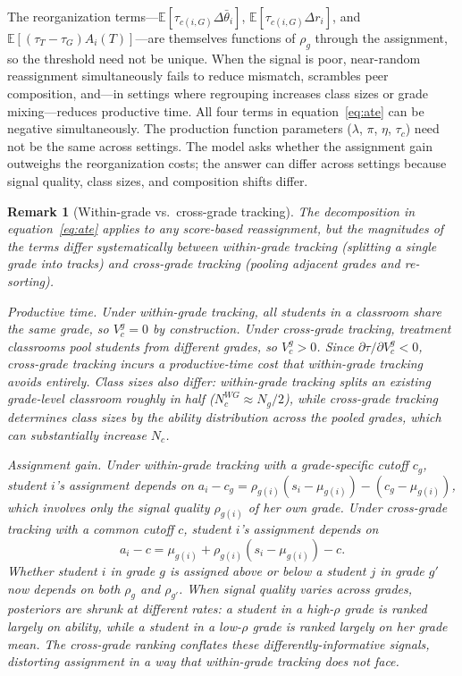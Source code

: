 \documentclass[11pt]{article}
\newtheorem{remark}{Remark}
\newcommand{\E}{\mathbb{E}}
\begin{document}
The reorganization terms---$\E[\tau_{c(i,G)}\Delta\bar{\theta}_i]$, $\E[\tau_{c(i,G)}\Delta r_i]$, and $\E[(\tau_T - \tau_G)A_i(T)]$---are themselves functions of $\rho_g$ through the assignment, so the threshold need not be unique. When the signal is poor, near-random reassignment simultaneously fails to reduce mismatch, scrambles peer composition, and---in settings where regrouping increases class sizes or grade mixing---reduces productive time. All four terms in equation~\eqref{eq:ate} can be negative simultaneously. The production function parameters ($\lambda$, $\pi$, $\eta$, $\tau_c$) need not be the same across settings. The model asks whether the assignment gain outweighs the reorganization costs; the answer can differ across settings because signal quality, class sizes, and composition shifts differ.

\begin{remark}[Within-grade vs.\ cross-grade tracking]
\label{rem:wg_cg}
The decomposition in equation~\eqref{eq:ate} applies to any score-based reassignment, but the magnitudes of the terms differ systematically between within-grade tracking (splitting a single grade into tracks) and cross-grade tracking (pooling adjacent grades and re-sorting).

\emph{Productive time.} Under within-grade tracking, all students in a classroom share the same grade, so $V^g_c = 0$ by construction. Under cross-grade tracking, treatment classrooms pool students from different grades, so $V^g_c > 0$. Since $\partial\tau/\partial V^g_c < 0$, cross-grade tracking incurs a productive-time cost that within-grade tracking avoids entirely. Class sizes also differ: within-grade tracking splits an existing grade-level classroom roughly in half ($N^{WG}_c \approx N_g/2$), while cross-grade tracking determines class sizes by the ability distribution across the pooled grades, which can substantially increase $N_c$.

\emph{Assignment gain.} Under within-grade tracking with a grade-specific cutoff $c_g$, student $i$'s assignment depends on $a_i - c_g = \rho_{g(i)}(s_i - \mu_{g(i)}) - (c_g - \mu_{g(i)})$, which involves only the signal quality $\rho_{g(i)}$ of her own grade. Under cross-grade tracking with a common cutoff $c$, student $i$'s assignment depends on
\begin{equation}
\label{eq:cg_assign}
a_i - c = \mu_{g(i)} + \rho_{g(i)}(s_i - \mu_{g(i)}) - c.
\end{equation}
Whether student $i$ in grade $g$ is assigned above or below a student $j$ in grade $g'$ now depends on both $\rho_g$ and $\rho_{g'}$. When signal quality varies across grades, posteriors are shrunk at different rates: a student in a high-$\rho$ grade is ranked largely on ability, while a student in a low-$\rho$ grade is ranked largely on her grade mean. The cross-grade ranking conflates these differently-informative signals, distorting assignment in a way that within-grade tracking does not face.
\end{remark}
\end{document}
